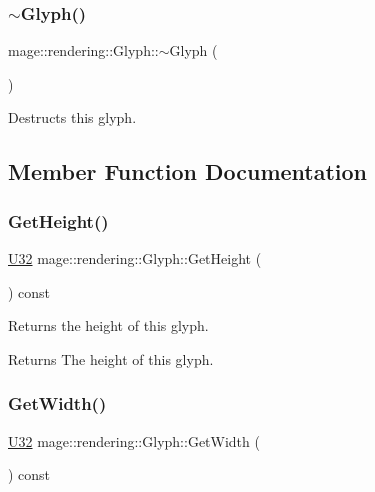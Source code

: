 \subsubsection{\texorpdfstring{$\sim$\+Glyph()}{~Glyph()}}
{\footnotesize\ttfamily mage\+::rendering\+::\+Glyph\+::$\sim$\+Glyph (\begin{DoxyParamCaption}{ }\end{DoxyParamCaption})\hspace{0.3cm}{\ttfamily [default]}}

Destructs this glyph. 

\subsection{Member Function Documentation}
\mbox{\label{structmage_1_1rendering_1_1_glyph_a67acfad4c7fe409493ca82f75c0a266f}} 
\subsubsection{\texorpdfstring{Get\+Height()}{GetHeight()}}
{\footnotesize\ttfamily \mbox{\hyperlink{namespacemage_aa5d6eaabaac3cdd01873d6a3d27e90f3}{U32}} mage\+::rendering\+::\+Glyph\+::\+Get\+Height (\begin{DoxyParamCaption}{ }\end{DoxyParamCaption}) const\hspace{0.3cm}{\ttfamily [noexcept]}}

Returns the height of this glyph.

\begin{DoxyReturn}{Returns}
The height of this glyph. 
\end{DoxyReturn}
\mbox{\label{structmage_1_1rendering_1_1_glyph_a0c1f398017a59df8678d7d7f8ee6609e}} 
\subsubsection{\texorpdfstring{Get\+Width()}{GetWidth()}}
{\footnotesize\ttfamily \mbox{\hyperlink{namespacemage_aa5d6eaabaac3cdd01873d6a3d27e90f3}{U32}} mage\+::rendering\+::\+Glyph\+::\+Get\+Width (\begin{DoxyParamCaption}{ }\end{DoxyParamCaption}) const\hspace{0.3cm}{\ttfamily [noexcept]}}

